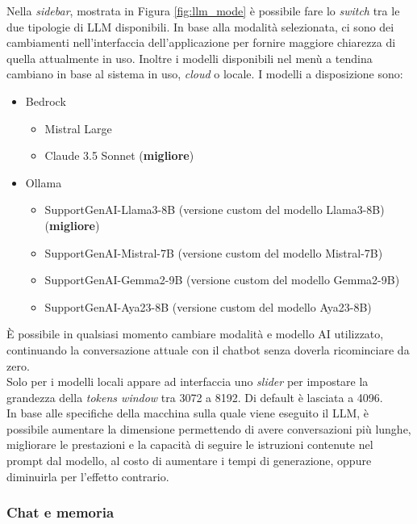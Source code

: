 Nella \textit{sidebar}, mostrata in Figura \ref{fig:llm_mode} è possibile fare lo \textit{switch} tra le due tipologie di LLM disponibili.
In base alla modalità selezionata, ci sono dei cambiamenti nell'interfaccia dell'applicazione per fornire maggiore chiarezza di quella attualmente in uso. 
Inoltre i modelli disponibili nel menù a tendina cambiano in base al sistema in uso, \textit{cloud} o locale. I modelli a disposizione sono:
\begin{itemize}
    \item Bedrock
    \begin{itemize}
        \item Mistral Large
        \item Claude 3.5 Sonnet (\textbf{migliore})
    \end{itemize}
    \item Ollama
    \begin{itemize}
        \item SupportGenAI-Llama3-8B (versione custom del modello Llama3-8B) (\textbf{migliore})
        \item SupportGenAI-Mistral-7B (versione custom del modello Mistral-7B)
        \item SupportGenAI-Gemma2-9B (versione custom del modello Gemma2-9B)
        \item SupportGenAI-Aya23-8B (versione custom del modello Aya23-8B)
    \end{itemize}
\end{itemize}
È possibile in qualsiasi momento cambiare modalità e modello AI utilizzato, continuando la conversazione attuale con il chatbot senza doverla ricominciare da zero.\\
Solo per i modelli locali appare ad interfaccia uno \textit{slider} per impostare la grandezza della \textit{tokens window} tra 3072 a 8192. Di default è lasciata a 4096.\\
In base alle specifiche della macchina sulla quale viene eseguito il LLM, è possibile aumentare la dimensione permettendo di avere conversazioni più lunghe, migliorare le prestazioni e la capacità di seguire le istruzioni contenute nel prompt dal modello, al costo di aumentare i tempi di generazione, oppure diminuirla per l'effetto contrario.

\subsubsection*{Chat e memoria}

